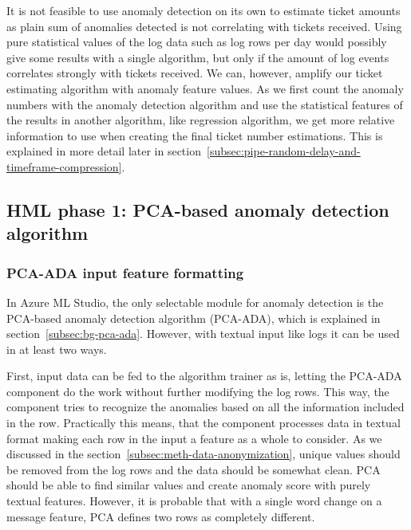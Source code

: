 It is not feasible to use anomaly detection on its own to estimate ticket amounts
as plain sum of anomalies detected
is not correlating with tickets received.
Using pure statistical values of the log data
such as log rows per day
would possibly give some results with a single algorithm,
but only if the amount of log events correlates strongly with tickets received.
We can, however,
amplify our ticket estimating algorithm with anomaly feature values.
As we first count the anomaly numbers with the anomaly detection algorithm
and use the statistical features of the results in another algorithm,
like regression algorithm,
we get more relative information to use
when creating the final ticket number estimations.
This is explained in more detail
later in section~\ref{subsec:pipe-random-delay-and-timeframe-compression}.




\subsection{HML phase 1: PCA-based anomaly detection algorithm}\label{subsec:pipe-pca-ada-input-output}



\subsubsection*{PCA-ADA input feature formatting}
In Azure ML Studio, the only selectable module for
anomaly detection is the PCA-based anomaly detection
algorithm (PCA-ADA), which is explained in section~\ref{subsec:bg-pca-ada}.
However,
with textual input like logs
it can be used in at least two ways.

First,
input data can be fed to
the algorithm trainer as is,
letting the PCA-ADA component
do the work without further modifying the log rows.
This way,
the component tries to recognize the anomalies
based on all the information included in the row.
Practically this means,
that the component processes data in textual format
making each row in the input
a feature as a whole to consider.
As we discussed in the section~\ref{subsec:meth-data-anonymization},
unique values should be removed from the log rows
and the data should be somewhat clean.
PCA should be able to find similar values
and create anomaly score with purely textual features.
However,
it is probable that with a single word change on a message feature,
PCA defines two rows as completely different.

